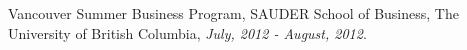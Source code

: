 \documentclass[letterpaper]{article}
\def\footerlink{}
\renewenvironment{itemize}{
  \begin{list}{}{
    \setlength{\leftmargin}{1.5em}
  }
}{
  \end{list}
}
\begin{document}
\begin{itemize}
  \item Vancouver Summer Business Program, 
   SAUDER School of Business, The University of British Columbia, {\it  July, 2012 - August, 2012}.
\end{itemize}





\end{document}
